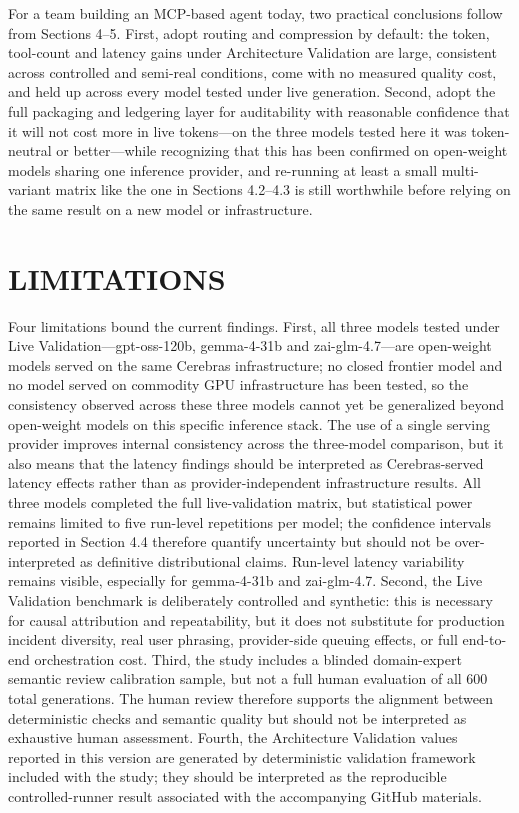 For a team building an MCP-based agent today, two practical conclusions follow from Sections 4--5. First, adopt routing and compression by default: the token, tool-count and latency gains under Architecture Validation are large, consistent across controlled and semi-real conditions, come with no measured quality cost, and held up across every model tested under live generation. Second, adopt the full packaging and ledgering layer for auditability with reasonable confidence that it will not cost more in live tokens---on the three models tested here it was token-neutral or better---while recognizing that this has been confirmed on open-weight models sharing one inference provider, and re-running at least a small multi-variant matrix like the one in Sections 4.2--4.3 is still worthwhile before relying on the same result on a new model or infrastructure.

\section{LIMITATIONS}

Four limitations bound the current findings. First, all three models tested under Live Validation---gpt-oss-120b, gemma-4-31b and zai-glm-4.7---are open-weight models served on the same Cerebras infrastructure; no closed frontier model and no model served on commodity GPU infrastructure has been tested, so the consistency observed across these three models cannot yet be generalized beyond open-weight models on this specific inference stack. The use of a single serving provider improves internal consistency across the three-model comparison, but it also means that the latency findings should be interpreted as Cerebras-served latency effects rather than as provider-independent infrastructure results. All three models completed the full live-validation matrix, but statistical power remains limited to five run-level repetitions per model; the confidence intervals reported in Section 4.4 therefore quantify uncertainty but should not be over-interpreted as definitive distributional claims. Run-level latency variability remains visible, especially for gemma-4-31b and zai-glm-4.7. Second, the Live Validation benchmark is deliberately controlled and synthetic: this is necessary for causal attribution and repeatability, but it does not substitute for production incident diversity, real user phrasing, provider-side queuing effects, or full end-to-end orchestration cost. Third, the study includes a blinded domain-expert semantic review calibration sample, but not a full human evaluation of all 600 total generations. The human review therefore supports the alignment between deterministic checks and semantic quality but should not be interpreted as exhaustive human assessment. Fourth, the Architecture Validation values reported in this version are generated by deterministic validation framework included with the study; they should be interpreted as the reproducible controlled-runner result associated with the accompanying GitHub materials.

